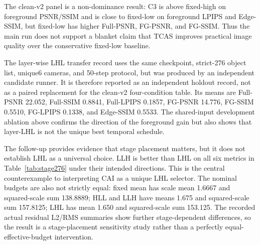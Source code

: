\documentclass[times,twocolumn,final]{elsarticle}
\begin{document}
The clean-v2 panel is a non-dominance result: C3 is above fixed-high on
foreground PSNR/SSIM and is close to fixed-low on foreground LPIPS and
Edge-SSIM, but fixed-low has higher Full-PSNR, FG-PSNR, and FG-SSIM. Thus the
main run does not support a blanket claim that TCAS improves practical image
quality over the conservative fixed-low baseline.

The layer-wise LHL transfer record uses the same checkpoint, strict-276 object
list, unique6 cameras, and 50-step protocol, but was produced by an independent
candidate runner. It is therefore reported as an independent holdout record,
not as a paired replacement for the clean-v2 four-condition table. Its means
are Full-PSNR 22.052, Full-SSIM 0.8841, Full-LPIPS 0.1857, FG-PSNR 14.776,
FG-SSIM 0.5510, FG-LPIPS 0.1338, and Edge-SSIM 0.5533. The shared-input
development ablation above confirms the direction of the foreground gain but
also shows that layer-LHL is not the unique best temporal schedule.

\begin{table}[t]
\centering
\caption{Stage-placement follow-up on the strict 276-object cohort. These are the six non-SSIM metrics from one paired run; LHL, HLL, and LLH use 17/16/17 early/middle/late steps. Lower is better for LPIPS.}
\label{tab:stage276}
\scriptsize
{}
\end{table}

The follow-up provides evidence that stage placement matters, but it does not
establish LHL as a universal choice. LLH is better than LHL on all six metrics in
Table~\ref{tab:stage276} under their intended directions. This is the central
counterexample to interpreting CAI as a unique LHL selector. The nominal
budgets are also not strictly equal: fixed mean has scale mean 1.6667 and
squared-scale sum 138.8889; HLL and LLH have means 1.675 and squared-scale
sum 157.8125; LHL has mean 1.650 and squared-scale sum 153.125. The recorded
actual residual L2/RMS summaries show further stage-dependent differences, so
the result is a stage-placement sensitivity study rather than a perfectly
equal-effective-budget intervention.
\end{document}
